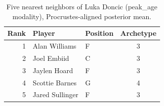 \begin{table}[htbp]
  \centering\small
  \begin{tabular}{rllc}
    \toprule
    Rank & Player & Position & Archetype \\
    \midrule
    1 & Alan Williams & F & 3 \\
    2 & Joel Embiid & C & 3 \\
    3 & Jaylen Hoard & F & 3 \\
    4 & Scottie Barnes & G & 4 \\
    5 & Jared Sullinger & F & 3 \\
    \bottomrule
  \end{tabular}
  \caption{Five nearest neighbors of Luka Doncic (peak_age modality), Procrustes-aligned posterior mean.}
  \label{tab:Luka_Doncic_neighbors_peak_age}
\end{table}

